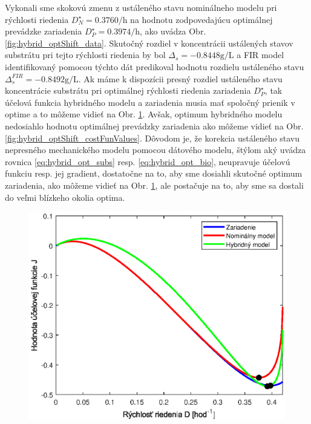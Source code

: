 Vykonali sme skokovú zmenu z ustáleného stavu nominálneho modelu pri rýchlosti riedenia $ D_{N}^{\star} = 0.3760\si{\per\hour} $ na hodnotu zodpovedajúcu optimálnej prevádzke zariadenia $ D_{P}^{\star} = 0.3974\si{\per\hour} $, ako uvádza Obr. \ref{fig:hybrid_optShift_data}. Skutočný rozdiel v koncentrácii ustálených stavov substrátu pri tejto rýchlosti riedenia by bol $ \Delta_{s} = -0.8448\si{\gram\per\liter} $ a FIR model identifikovaný pomocou týchto dát predikoval hodnotu rozdielu ustáleného stavu $ \Delta_{s}^{FIR} = -0.8492\si{\gram\per\liter} $. Ak máme k dispozícii presný rozdiel ustáleného stavu koncentrácie substrátu pri optimálnej rýchlosti riedenia zariadenia $ D_{P}^{\star} $, tak účelová funkcia hybridného modelu a zariadenia musia mať spoločný prienik v optime a to môžeme vidieť na Obr. \ref{fig:hybrid_and_monod_costFun_compar}. Avšak, optimum hybridného modelu nedosiahlo hodnotu optimálnej prevádzky zariadenia ako môžeme vidieť na Obr. \ref{fig:hybrid_optShift_costFunValues}. Dôvodom je, že korekcia ustáleného stavu nepresného mechanického modelu pomocou dátového modelu, štýlom aký uvádza rovnica \eqref{eq:hybrid_opt_subs} resp. \eqref{eq:hybrid_opt_bio}, neupravuje účelovú funkciu resp. jej gradient, dostatočne na to, aby sme dosiahli skutočné optimum zariadenia, ako môžeme vidieť na Obr. \ref{fig:hybrid_and_monod_costFun_compar}, ale postačuje na to, aby sme sa dostali do veľmi blízkeho okolia optima.
\begin{figure}
	\centering
	\includegraphics[width=0.7\linewidth]{images/hybrid_and_monod_costFun_compar}
	\caption{}
	\label{fig:hybrid_and_monod_costFun_compar}
\end{figure}

